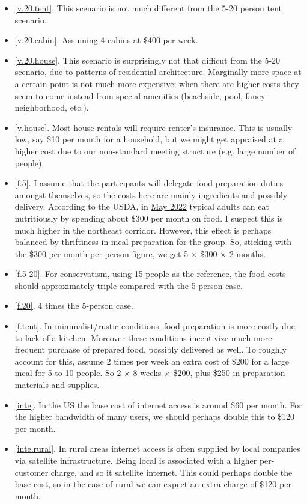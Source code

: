 \documentclass[10pt]{article}
\begin{document}
\begin{itemize}[leftmargin=*]
  \item[]{\ref{v.20.tent}. This scenario is not much different from the 5-20 person tent scenario.}
  \item[]{\ref{v.20.cabin}. Assuming 4 cabins at \$400 per week.}
  \item[]{\ref{v.20.house}. This scenario is surprisingly not that difficut from the 5-20 scenario, due to patterns of residential architecture. Marginally more space at a certain point is not much more expensive; when there are higher costs they seem to come instead from special amenities (beachside, pool, fancy neighborhood, etc.).}
  \item[]{\ref{v.house}. Most house rentals will require renter's insurance. This is usually low, say \$10 per month for a household, but we might get appraised at a higher cost due to our non-standard meeting structure (e.g. large number of people).}
  \item[]{\ref{f.5}. I assume that the participants will delegate food preparation duties amongst themselves, so the costs here are mainly ingredients and possibly delivery. According to the USDA, in \href{https://fns-prod.azureedge.us/sites/default/files/media/file/CostofFoodMay2022LowModLib.pdf}{May 2022} typical adults can eat nutritiously by spending about \$300 per month on food. I suspect this is much higher in the northeast corridor. However, this effect is perhaps balanced by thriftiness in meal preparation for the group. So, sticking with the \$300 per month per person figure, we get 5 $\times$ \$300 $\times$ 2 months.}
  \item[]{\ref{f.5-20}. For conservatism, using 15 people as the reference, the food costs should approximately triple compared with the 5-person case.}
  \item[]{\ref{f.20}. 4 times the 5-person case.}
  \item[]{\ref{f.tent}. In minimalist/rustic conditions, food preparation is more costly due to lack of a kitchen. Moreover these conditions incentivize much more frequent purchase of prepared food, possibly delivered as well. To roughly account for this, assume 2 times per week an extra cost of \$200 for a large meal for 5 to 10 people. So 2 $\times$ 8 weeks $\times$ \$200, plus \$250 in preparation materials and supplies.}
  \item[]{\ref{inte}. In the US the base cost of internet access is around \$60 per month. For the higher bandwidth of many users, we should perhaps double this to \$120 per month.}
  \item[]{\ref{inte.rural}. In rural areas internet access is often supplied by local companies via satellite infrastructure. Being local is associated with a higher per-customer charge, and so it satellite internet. This could perhaps double the base cost, so in the case of rural we can expect an extra charge of \$120 per month.}

\end{itemize}
\end{document}
